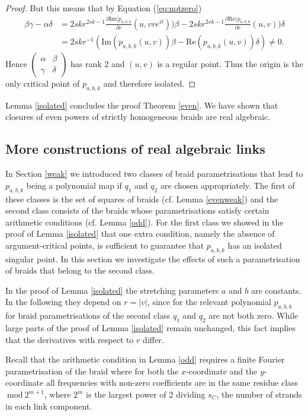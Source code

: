 \documentclass[notitlepage,12pt]{revtex4-1}
\begin{document}
\begin{proof}
But this means that by Equation (\ref{eq:notzero})
\begin{align}
\beta\gamma-\alpha\delta&=2skr^{2sk-1}\frac{\partial \mathrm{Im}(p_{a,b,k}}{\partial r}(u,vre^{it}))\beta-2skr^{2sk-1}\frac{\partial \mathrm{Re}(p_{a,b,k}}{\partial r}(u,v))\delta\nonumber\\
&=2skr^{-1}(\mathrm{Im}(p_{a,b,k}(u,v))\beta-\mathrm{Re}(p_{a,b,k}(u,v))\delta)\neq 0.
\end{align}
Hence $\left(\begin{smallmatrix}\alpha & \beta\\ \gamma & \delta\end{smallmatrix}\right)$ has rank 2 and $(u,v)$ is a regular point. Thus the origin is the only critical point of $p_{a,b,k}$ and therefore isolated.
\end{proof}

Lemma \ref{isolated} concludes the proof Theorem \ref{even}. We have shown that closures of even powers of strictly homogeneous braids are real algebraic.

\subsection{More constructions of real algebraic links}

In Section \ref{weak} we introduced two classes of braid parametrisations that lead to $p_{a,b,k}$ being a polynomial map if $q_{1}$ and $q_{2}$ are chosen appropriately. The first of these classes is the set of squares of braids (cf. Lemma \ref{evenweak}) and the second class consists of the braids whose parametrisations satisfy certain arithmetic conditions (cf. Lemma \ref{odd}). For the first class we showed in the proof of Lemma \ref{isolated} that one extra condition, namely the absence of argument-critical points, is sufficient to guarantee that $p_{a,b,k}$ has an isolated singular point. In this section we investigate the effects of such a parametrisation of braids that belong to the second class. 

In the proof of Lemma \ref{isolated} the stretching parameters $a$ and $b$ are constants. In the following they depend on $r=|v|$, since for the relevant polynomial $p_{a,b,k}$ for braid parametrisations of the second class $q_{1}$ and $q_{2}$ are not both zero. While large parts of the proof of Lemma \ref{isolated} remain unchanged, this fact implies that the derivatives with respect to $r$ differ.  

Recall that the arithmetic condition in Lemma \ref{odd} requires a finite Fourier parametrisation of the braid where for both the $x$-coordinate and the $y$-coordinate all frequencies with non-zero coefficients are in the same residue class $\ \mathrm{mod}\  2^{m+1}$, where $2^m$ is the largest power of 2 dividing $s_{C}$, the number of strands in each link component. 
\end{document}
